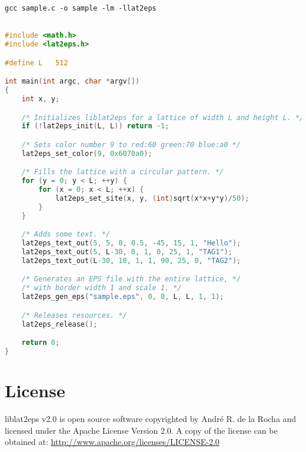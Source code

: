 \documentclass[a4paper]{article}
\begin{document}
\texttt{gcc sample.c -o sample -lm -llat2eps}
\bigbreak\bigbreak

\begin{lstlisting}[language=C, frame=single]

#include <math.h>
#include <lat2eps.h>

#define L   512

int main(int argc, char *argv[])
{
	int x, y;

	/* Initializes liblat2eps for a lattice of width L and height L. */
	if (!lat2eps_init(L, L)) return -1;

	/* Sets color number 9 to red:60 green:70 blue:a0 */
	lat2eps_set_color(9, 0x6070a0);

	/* Fills the lattice with a circular pattern. */
	for (y = 0; y < L; ++y) {
		for (x = 0; x < L; ++x) {
			lat2eps_set_site(x, y, (int)sqrt(x*x+y*y)/50);
		}
	}

	/* Adds some text. */
	lat2eps_text_out(5, 5, 0, 0.5, -45, 15, 1, "Hello");
	lat2eps_text_out(5, L-30, 0, 1, 0, 25, 1, "TAG1");
	lat2eps_text_out(L-30, 10, 1, 1, 90, 25, 0, "TAG2");

	/* Generates an EPS file with the entire lattice, */
	/* with border width 1 and scale 1. */
	lat2eps_gen_eps("sample.eps", 0, 0, L, L, 1, 1); 

	/* Releases resources. */
	lat2eps_release();

	return 0;	
}

\end{lstlisting}
\bigbreak\bigbreak


\section{License}

liblat2eps v2.0 is open source software copyrighted by André R. de la Rocha and licensed under the Apache License Version 2.0. A copy of the license can be obtained at: \url{http://www.apache.org/licenses/LICENSE-2.0}
\end{document}
